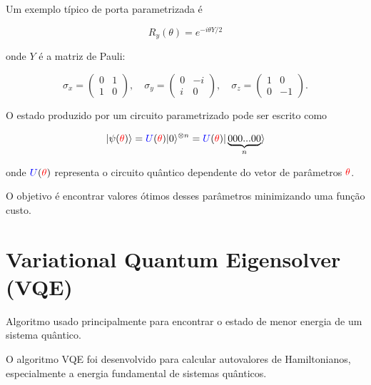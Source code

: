 \documentclass[a4paper,12pt]{article}
\begin{document}
Um exemplo típico de porta parametrizada é

\begin{equation}
\boxed{
R_y(\theta) = e^{-i\theta Y/2}
}
\end{equation}

onde $Y$ é a matriz de Pauli:

\begin{equation}
\sigma_x =
\begin{pmatrix}0 & 1 \\ 1 & 0\end{pmatrix},
\quad
\sigma_y =
\begin{pmatrix}0 & -i \\ i & 0\end{pmatrix},
\quad
\sigma_z =
\begin{pmatrix}1 & 0 \\ 0 & -1\end{pmatrix}.
\end{equation}


O estado produzido por um \colorbox{blue!20}{circuito parametrizado} pode ser escrito como

\begin{equation}
|\psi(\textcolor{red}{\theta})\rangle = \textcolor{blue}{U}(\textcolor{red}{\theta})|0\rangle^{\otimes n} = \textcolor{blue}{U}(\textcolor{red}{\theta})|\underbrace{000...00}_{n}\rangle
\end{equation}

onde $\textcolor{blue}{U}(\textcolor{red}{\theta})$ representa o circuito quântico dependente do vetor de 
parâmetros $\textcolor{red}{\theta}$.

\colorbox{green!30}{O objetivo é encontrar valores ótimos desses parâmetros minimizando uma função}\newline 
\colorbox{green!30}{custo}.

\section{Variational Quantum Eigensolver (VQE)}

\begin{tcolorbox}[colback=red!10,colframe=red!70!black,title=VQE]
Algoritmo usado principalmente para 
encontrar o estado de menor energia de um sistema quântico.
\end{tcolorbox}

O \colorbox{green!30}{algoritmo VQE} foi desenvolvido para \colorbox{green!30}{calcular autovalores de Hamiltonianos}, 
especialmente a \colorbox{green!30}{energia fundamental de sistemas quânticos}.
\end{document}
